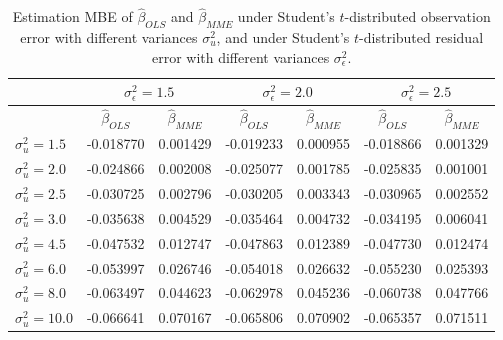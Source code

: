 \documentclass{article}
\begin{document}
\begin{table}[ht]
    \centering
    \caption{Estimation MBE of $\hat{\beta}_{OLS}$ and $\hat{\beta}_{MME}$ under Student's $t$-distributed observation error with different variances $\sigma^2_u$, and under Student's $t$-distributed residual error with different variances $\sigma^2_\epsilon$.}
    \label{Tab:MBE_t}
    \begin{tabular}[t]{lcccccc}
        \hline
        &\multicolumn{2}{c}{$\sigma^2_\epsilon=1.5$}&\multicolumn{2}{c}{$\sigma^2_\epsilon=2.0$}&\multicolumn{2}{c}{$\sigma^2_\epsilon=2.5$}\\
        \hline
        &$\hat{\beta}_{OLS}$&$\hat{\beta}_{MME}$&$\hat{\beta}_{OLS}$&$\hat{\beta}_{MME}$&$\hat{\beta}_{OLS}$&$\hat{\beta}_{MME}$\\
        \hline
        $\sigma^2_u = 1.5$&-0.018770&0.001429&-0.019233&0.000955&-0.018866&0.001329\\
        $\sigma^2_u = 2.0$&-0.024866&0.002008&-0.025077&0.001785&-0.025835&0.001001\\
        $\sigma^2_u = 2.5$&-0.030725&0.002796&-0.030205&0.003343&-0.030965&0.002552\\
        $\sigma^2_u = 3.0$&-0.035638&0.004529&-0.035464&0.004732&-0.034195&0.006041\\
        $\sigma^2_u = 4.5$&-0.047532&0.012747&-0.047863&0.012389&-0.047730&0.012474\\
        $\sigma^2_u = 6.0$&-0.053997&0.026746&-0.054018&0.026632&-0.055230&0.025393\\
        $\sigma^2_u = 8.0$&-0.063497&0.044623&-0.062978&0.045236&-0.060738&0.047766\\
        $\sigma^2_u = 10.0$&-0.066641&0.070167&-0.065806&0.070902&-0.065357&0.071511\\
        \hline
    \end{tabular}
\end{table}
\end{document}
